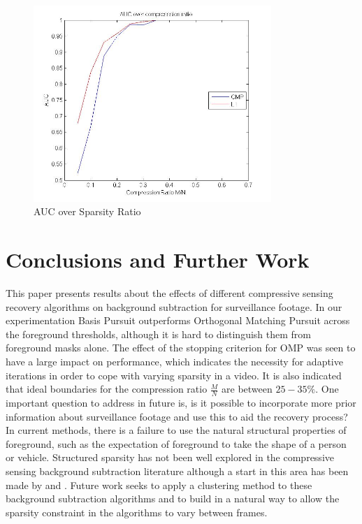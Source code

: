 \begin{figure}[t]
  \centering
  \includegraphics[width = 9cm]{AUCcompressionRatio}
  \caption{AUC over Sparsity Ratio}
  \label{fig:sr}
\end{figure}


\section{Conclusions and Further Work}\label{sec:conclusions}
This paper presents results about the effects of different compressive sensing recovery algorithms on background subtraction for surveillance footage. In our experimentation Basis Pursuit outperforms Orthogonal Matching Pursuit across the foreground thresholds, although it is hard to distinguish them from foreground masks alone.  The effect of the stopping criterion for OMP was seen to have a large impact on performance, which indicates the necessity for adaptive iterations in order to cope with varying sparsity in a video. It is also indicated that ideal boundaries for the compression ratio $\frac{M}{N}$ are between $25 - 35\%$.  One important question to address in future is, is it possible to incorporate more prior information about surveillance footage and use this to aid the recovery process? In current methods, there is a failure to use the natural structural properties of foreground, such as the expectation of foreground to take the shape of a person or vehicle. Structured sparsity has not been well explored in the compressive sensing background subtraction literature although a start in this area has been made by \cite{La2006} and \cite{Duarte2008}. Future work seeks to apply a clustering method to these background subtraction algorithms and to build in a natural way to allow the sparsity constraint in the algorithms to vary between frames. 




